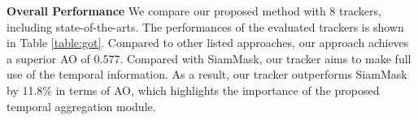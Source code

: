 \textbf{Overall Performance}
We compare our proposed method with 8 trackers, including state-of-the-arts.
The performances of the evaluated trackers is shown in Table \ref{table:got}.
Compared to other listed approaches, our approach achieves a superior AO of 0.577.
Compared with SiamMask, our tracker aims to make full use of the temporal information. As a result, our tracker outperforms SiamMask by 11.8\% in terms of AO, which highlights the importance of the proposed temporal aggregation module.

